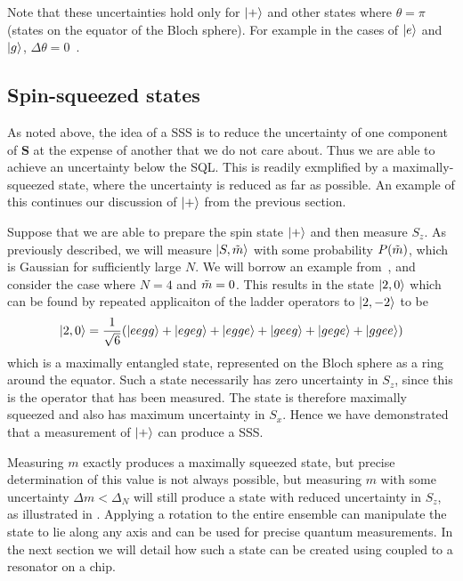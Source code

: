 Note that these uncertainties hold only for $\ket{+}$ and other states where
$\theta = \pi$ (states on the equator of the Bloch sphere). For example in the
cases of $\ket{e}$ and $\ket{g}$, $\Delta \theta = 0$~\cite{PhysRevA.47.3554}.

\subsection{Spin-squeezed states}

As noted above, the idea of a SSS is to reduce the uncertainty of one component
of $\mathbf{S}$ at the expense of another that we do not care about. Thus we
are able to achieve an uncertainty below the SQL. This is readily exmplified by
a maximally-squeezed state, where the uncertainty is reduced as far as
possible. An example of this continues our discussion of $\ket{+}$ from the
previous section.

Suppose that we are able to prepare the spin state $\ket{+}$ and then measure
$S_z$. As previously described, we will measure $\ket{S, \tilde{m}}$ with some
probability $P(\tilde{m})$, which is Gaussian for sufficiently large $N$. We
will borrow an example from~, and consider the case where
$N=4$ and $\tilde{m}=0$. This results in the state $\ket{2, 0}$ which can be
found by repeated applicaiton of the ladder operators to $\ket{2,-2}$ to be
%
\begin{equation}
  \ket{2,0} = \frac{1}{\sqrt{6}}(\ket{eegg} + \ket{egeg} + \ket{egge} +
  \ket{geeg} + \ket{gege} + \ket{ggee})
\end{equation}
%
which is a maximally entangled state, represented on the Bloch sphere as a ring
around the equator.
%
Such a state necessarily has zero uncertainty in $S_z$, since this is the
operator that has been measured. The state is therefore maximally squeezed and
also has maximum uncertainty in $S_x$.
%
%
Hence we have demonstrated that a measurement of $\ket{+}$ can produce a SSS.


Measuring $m$ exactly produces a maximally squeezed state, but precise
determination of this value is not always possible, but measuring $m$ with some
uncertainty $\Delta m < \Delta_N$ will still produce a state with reduced
uncertainty in $S_z$, as illustrated in . Applying a
rotation to the entire ensemble can manipulate the state to lie along any axis
and can be used for precise quantum measurements. In the next section we will
detail how such a state can be created using \CaF{} coupled to a resonator on a
chip.


